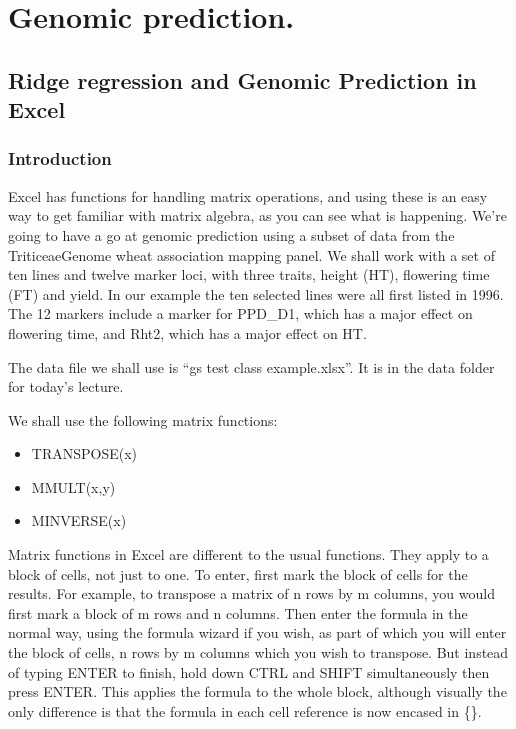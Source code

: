 \documentclass[
]{book}
\providecommand{\tightlist}{%
  \setlength{\itemsep}{0pt}\setlength{\parskip}{0pt}}
\begin{document}
\hypertarget{Genomic-prediction}{%
\chapter{Genomic prediction.}\label{Genomic-prediction}}

\hypertarget{ridge-regression-and-genomic-prediction-in-excel}{%
\section{Ridge regression and Genomic Prediction in Excel}\label{ridge-regression-and-genomic-prediction-in-excel}}

\hypertarget{introduction-4}{%
\subsection{Introduction}\label{introduction-4}}

Excel has functions for handling matrix operations, and using these is an easy way to get familiar with matrix algebra, as you can see what is happening. We're going to have a go at genomic prediction using a subset of data from the TriticeaeGenome wheat association mapping panel. We shall work with a set of ten lines and twelve marker loci, with three traits, height (HT), flowering time (FT) and yield. In our example the ten selected lines were all first listed in 1996. The 12 markers include a marker for PPD\_D1, which has a major effect on flowering time, and Rht2, which has a major effect on HT.

The data file we shall use is ``gs test class example.xlsx''. It is in the data folder for today's lecture.

We shall use the following matrix functions:

\begin{itemize}
\tightlist
\item
  TRANSPOSE(x)
\item
  MMULT(x,y)
\item
  MINVERSE(x)
\end{itemize}

Matrix functions in Excel are different to the usual functions. They apply to a block of cells, not just to one. To enter, first mark the block of cells for the results. For example, to transpose a matrix of n rows by m columns, you would first mark a block of m rows and n columns. Then enter the formula in the normal way, using the formula wizard if you wish, as part of which you will enter the block of cells, n rows by m columns which you wish to transpose. But instead of typing ENTER to finish, hold down CTRL and SHIFT simultaneously then press ENTER. This applies the formula to the whole block, although visually the only difference is that the formula in each cell reference is now encased in \{\}.
\end{document}
